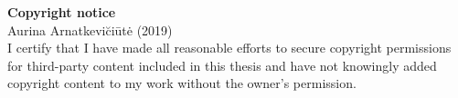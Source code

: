 \textbf{Copyright notice}\\

\textcopyright Aurina Arnatkevi\u{c}i\={u}t\.{e} (2019)\\

I certify that I have made all reasonable efforts to secure copyright permissions for third-party content included in this thesis and have not knowingly added copyright content to my work without the owner's permission.


\cleardoublepage

